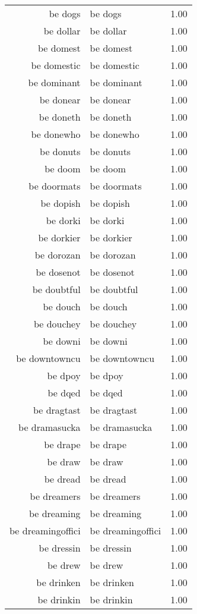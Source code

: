 \begin{table}[ht]
\begin{tabular}{rlr}
  be dogs & be dogs & 1.00 \\ 
  be dollar & be dollar & 1.00 \\ 
  be domest & be domest & 1.00 \\ 
  be domestic & be domestic & 1.00 \\ 
  be dominant & be dominant & 1.00 \\ 
  be donear & be donear & 1.00 \\ 
  be doneth & be doneth & 1.00 \\ 
  be donewho & be donewho & 1.00 \\ 
  be donuts & be donuts & 1.00 \\ 
  be doom & be doom & 1.00 \\ 
  be doormats & be doormats & 1.00 \\ 
  be dopish & be dopish & 1.00 \\ 
  be dorki & be dorki & 1.00 \\ 
  be dorkier & be dorkier & 1.00 \\ 
  be dorozan & be dorozan & 1.00 \\ 
  be dosenot & be dosenot & 1.00 \\ 
  be doubtful & be doubtful & 1.00 \\ 
  be douch & be douch & 1.00 \\ 
  be douchey & be douchey & 1.00 \\ 
  be downi & be downi & 1.00 \\ 
  be downtowncu & be downtowncu & 1.00 \\ 
  be dpoy & be dpoy & 1.00 \\ 
  be dqed & be dqed & 1.00 \\ 
  be dragtast & be dragtast & 1.00 \\ 
  be dramasucka & be dramasucka & 1.00 \\ 
  be drape & be drape & 1.00 \\ 
  be draw & be draw & 1.00 \\ 
  be dread & be dread & 1.00 \\ 
  be dreamers & be dreamers & 1.00 \\ 
  be dreaming & be dreaming & 1.00 \\ 
  be dreamingoffici & be dreamingoffici & 1.00 \\ 
  be dressin & be dressin & 1.00 \\ 
  be drew & be drew & 1.00 \\ 
  be drinken & be drinken & 1.00 \\ 
  be drinkin & be drinkin & 1.00 \\ 

\end{tabular}
\end{table}
